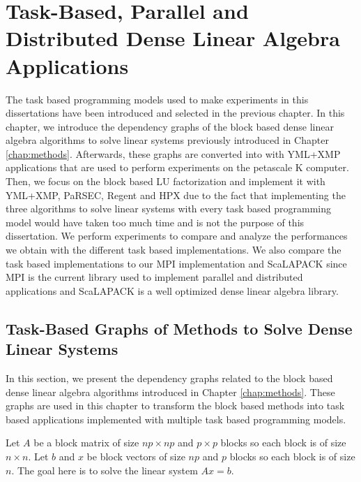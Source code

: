 \chapter{Task-Based, Parallel and Distributed Dense Linear Algebra Applications \label{chap:exp_dense}}
\graphicspath{{chapters/exp_dense/}}

The task based programming models used to make experiments in this dissertations have been introduced and selected in the previous chapter.
In this chapter, we introduce the dependency graphs of the block based dense linear algebra algorithms to solve linear systems previously introduced in Chapter \ref{chap:methods}.
Afterwards, these graphs are converted into with YML+XMP applications that are used to perform experiments on the petascale K computer.
Then, we focus on the block based LU factorization and implement it with YML+XMP, PaRSEC, Regent and HPX due to the fact that implementing the three algorithms to solve linear systems with every task based programming model would have taken too much time and is not the purpose of this dissertation.
We perform experiments to compare and analyze the performances we obtain with the different task based implementations.
We also compare the task based implementations to our MPI implementation and ScaLAPACK since MPI is the current library used to implement parallel and distributed applications and ScaLAPACK is a well optimized dense linear algebra library.

\section{Task-Based Graphs of Methods to Solve Dense Linear Systems}
In this section, we present the dependency graphs related to the block based dense linear algebra algorithms introduced in Chapter \ref{chap:methods}.
These graphs are used in this chapter to transform the block based methods into task based applications implemented with multiple task based programming models.

Let $A$ be a block matrix of size $np \times np$ and $p \times p$ blocks so each block is of size $n \times n$.
Let $b$ and $x$ be block vectors of size $np$ and $p$ blocks so each block is of size $n$.
The goal here is to solve the linear system $Ax=b$.

